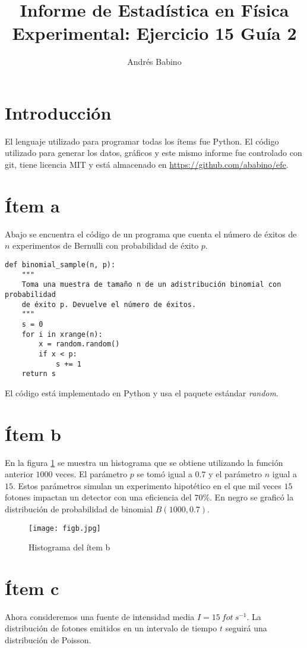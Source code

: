 \documentclass{article}
\title{Informe de Estadística en Física Experimental: Ejercicio 15 Guía 2}
\author{Andr\'es Babino}
\begin{document}
\maketitle
\section{Introducción}
El lenguaje utilizado para programar todas los ítems fue Python.
El código utilizado para generar los datos, gráficos y este mismo informe fue controlado con git, tiene licencia MIT y está almacenado en \url{https://github.com/ababino/efe}.

\section{Ítem a}
Abajo se encuentra el código de un programa que cuenta el número de éxitos de $n$ experimentos de Bernulli  con probabilidad de éxito $p$.
\begin{lstlisting}
def binomial_sample(n, p):
    """
    Toma una muestra de tamaño n de un adistribución binomial con probabilidad
    de éxito p. Devuelve el número de éxitos.
    """
    s = 0
    for i in xrange(n):
        x = random.random()
        if x < p:
            s += 1
    return s
\end{lstlisting}
El código está implementado en Python y usa el paquete estándar \textit{random}.

\section{Ítem b}
En la figura \ref{fig:itemb} se muestra un histograma que se obtiene utilizando la función anterior $1000$ veces.
El parámetro $p$ se tomó igual a $0.7$ y el parámetro $n$ igual a $15$.
Estos parámetros simulan un experimento hipotético en el que mil veces $15$ fotones impactan un detector con una eficiencia del $70\%$.
En negro se graficó la distribución de probabilidad de binomial $B(1000, 0.7)$.

\begin{figure}
\centering
\texttt{[image: figb.jpg]}
\caption[]{Histograma del ítem b}
\label{fig:itemb}
\end{figure}

\section{Ítem c}
Ahora consideremos una fuente de intensidad media $I=15\ fot\ s^{-1}$.
La distribución de fotones emitidos en un intervalo de tiempo $t$ seguirá una distribución de Poisson.
\end{document}
